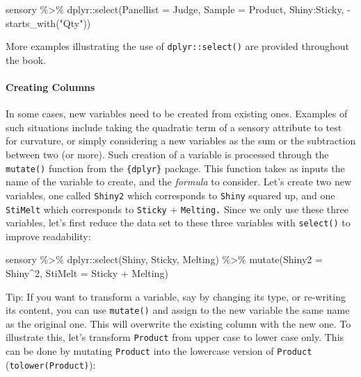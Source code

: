 \documentclass[
]{book}
\newenvironment{Shaded}{\begin{snugshade}}{\end{snugshade}}
\newcommand{\AttributeTok}[1]{\textcolor[rgb]{0.77,0.63,0.00}{#1}}
\newcommand{\DecValTok}[1]{\textcolor[rgb]{0.00,0.00,0.81}{#1}}
\newcommand{\FunctionTok}[1]{\textcolor[rgb]{0.00,0.00,0.00}{#1}}
\newcommand{\NormalTok}[1]{#1}
\newcommand{\SpecialCharTok}[1]{\textcolor[rgb]{0.00,0.00,0.00}{#1}}
\newcommand{\StringTok}[1]{\textcolor[rgb]{0.31,0.60,0.02}{#1}}
\begin{document}
\begin{Shaded}
\begin{Highlighting}[]
\NormalTok{sensory }\SpecialCharTok{\%\textgreater{}\%} 
\NormalTok{  dplyr}\SpecialCharTok{::}\FunctionTok{select}\NormalTok{(}\AttributeTok{Panellist =}\NormalTok{ Judge, }\AttributeTok{Sample =}\NormalTok{ Product, Shiny}\SpecialCharTok{:}\NormalTok{Sticky, }\SpecialCharTok{{-}}\FunctionTok{starts\_with}\NormalTok{(}\StringTok{"Qty"}\NormalTok{))}
\end{Highlighting}
\end{Shaded}

More examples illustrating the use of \texttt{dplyr::select()} are provided throughout the book.

\hypertarget{creating-columns}{%
\paragraph{Creating Columns}\label{creating-columns}}

In some cases, new variables need to be created from existing ones. Examples of such situations include taking the quadratic term of a sensory attribute to test for curvature, or simply considering a new variables as the sum or the subtraction between two (or more). Such creation of a variable is processed through the \texttt{mutate()} function from the \texttt{\{dplyr\}} package. This function takes as inputs the name of the variable to create, and the \emph{formula} to consider.
Let's create two new variables, one called \texttt{Shiny2} which corresponds to \texttt{Shiny} squared up, and one \texttt{StiMelt} which corresponds to \texttt{Sticky} + \texttt{Melting.} Since we only use these three variables, let's first reduce the data set to these three variables with \texttt{select()} to improve readability:

\begin{Shaded}
\begin{Highlighting}[]
\NormalTok{sensory }\SpecialCharTok{\%\textgreater{}\%} 
\NormalTok{  dplyr}\SpecialCharTok{::}\FunctionTok{select}\NormalTok{(Shiny, Sticky, Melting) }\SpecialCharTok{\%\textgreater{}\%} 
  \FunctionTok{mutate}\NormalTok{(}\AttributeTok{Shiny2 =}\NormalTok{ Shiny}\SpecialCharTok{\^{}}\DecValTok{2}\NormalTok{, }
         \AttributeTok{StiMelt =}\NormalTok{ Sticky }\SpecialCharTok{+}\NormalTok{ Melting)}
\end{Highlighting}
\end{Shaded}

Tip: If you want to transform a variable, say by changing its type, or re-writing its content, you can use \texttt{mutate()} and assign to the new variable the same name as the original one. This will overwrite the existing column with the new one. To illustrate this, let's transform \texttt{Product} from upper case to lower case only. This can be done by mutating \texttt{Product} into the lowercase version of \texttt{Product} (\texttt{tolower(Product)}):
\end{document}
